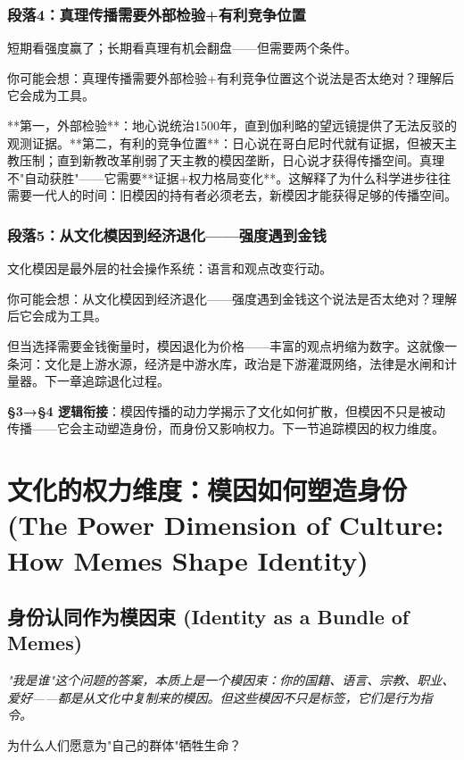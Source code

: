 \documentclass[a4paper,12pt]{book}
\newenvironment{motivation}{\begin{tcolorbox}[colback=gray!10,colframe=gray!60,title=\textit{本章动机 (Motivation)},fonttitle=\bfseries,arc=0mm,leftrule=3mm]\small\itshape}{\end{tcolorbox}}
\newenvironment{questionbox}{\begin{tcolorbox}[colback=red!3!white,colframe=red!60!black]}{\end{tcolorbox}}
\begin{document}
\begin{motivation}
\begin{motivation}
\begin{motivation}
	\subsubsection*{段落4：真理传播需要外部检验+有利竞争位置}
	短期看强度赢了；长期看真理有机会翻盘——但需要两个条件。
	\begin{tcolorbox}[colback=yellow!5, title=\textit{读者行为预测}]
		你可能会想：真理传播需要外部检验+有利竞争位置这个说法是否太绝对？理解后它会成为工具。
	\end{tcolorbox}

**第一，外部检验**：地心说统治1500年，直到伽利略的望远镜提供了无法反驳的观测证据。**第二，有利的竞争位置**：日心说在哥白尼时代就有证据，但被天主教压制；直到新教改革削弱了天主教的模因垄断，日心说才获得传播空间。真理不"自动获胜"——它需要**证据+权力格局变化**。这解释了为什么科学进步往往需要一代人的时间：旧模因的持有者必须老去，新模因才能获得足够的传播空间。

	\subsubsection*{段落5：从文化模因到经济退化——强度遇到金钱}
	文化模因是最外层的社会操作系统：语言和观点改变行动。
	\begin{tcolorbox}[colback=yellow!5, title=\textit{读者行为预测}]
		你可能会想：从文化模因到经济退化——强度遇到金钱这个说法是否太绝对？理解后它会成为工具。
	\end{tcolorbox}

但当选择需要金钱衡量时，模因退化为价格——丰富的观点坍缩为数字。这就像一条河：文化是上游水源，经济是中游水库，政治是下游灌溉网络，法律是水闸和计量器。下一章追踪退化过程。

	\textbf{§3→§4 逻辑衔接}：模因传播的动力学揭示了文化如何扩散，但模因不只是被动传播——它会主动塑造身份，而身份又影响权力。下一节追踪模因的权力维度。


	
	\section{文化的权力维度：模因如何塑造身份 (The Power Dimension of Culture: How Memes Shape Identity)}

	\subsection{身份认同作为模因束 (Identity as a Bundle of Memes)}
	\begin{motivation}
		"我是谁"这个问题的答案，本质上是一个模因束：你的国籍、语言、宗教、职业、爱好——都是从文化中复制来的模因。但这些模因不只是标签，它们是行为指令。
	\end{motivation}
	\begin{questionbox}
		为什么人们愿意为"自己的群体"牺牲生命？
	\end{questionbox}


\end{motivation}
\end{motivation}
\end{motivation}
\end{document}
